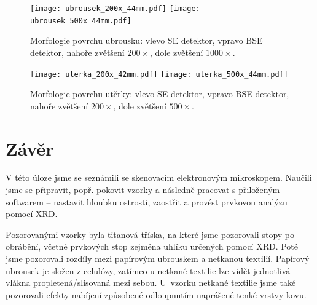\documentclass[a4paper,12pt]{article}
\begin{document}
\begin{figure}[h!]
	\centering
	\texttt{[image: ubrousek\_200x\_44mm.pdf]}
	\texttt{[image: ubrousek\_500x\_44mm.pdf]}
	\caption{\centering Morfologie povrchu ubrousku: vlevo SE detektor, vpravo 
	BSE 
		detektor, nahoře zvětšení $200\times$, dole zvětšení $1000\times$.}
	\label{fig:ubrousek}
\end{figure}

\begin{figure}[h!]
	\centering
	\texttt{[image: uterka\_200x\_42mm.pdf]}
	\texttt{[image: uterka\_500x\_44mm.pdf]}
	\caption{\centering Morfologie povrchu utěrky: vlevo SE detektor, vpravo 
	BSE detektor, nahoře zvětšení $200\times$, dole zvětšení $500\times$.}
	\label{fig:uterka}
\end{figure}

\clearpage
\section{Závěr}\noindent
V této úloze jsme se seznámili se skenovacím elektronovým mikroskopem. Naučili 
jsme se připravit, popř. pokovit vzorky a následně pracovat s přiloženým 
softwarem -- nastavit hloubku ostrosti, zaostřit a provést prvkovou analýzu 
pomocí XRD.
\par Pozorovanými vzorky byla titanová tříska, na které jsme pozorovali stopy 
po obrábění, včetně prvkových stop zejména uhlíku určených pomocí XRD. Poté 
jsme pozorovali rozdíly mezi papírovým ubrouskem a netkanou textilií. Papírový 
ubrousek je složen z celulózy, zatímco u netkané textilie lze vidět jednotlivá 
vlákna propletená/slisovaná mezi sebou. U~vzor\-ku netkané textilie jsme také 
pozorovali efekty nabíjení způsobené odloupnutím naprášené tenké vrstvy kovu.
\end{document}
